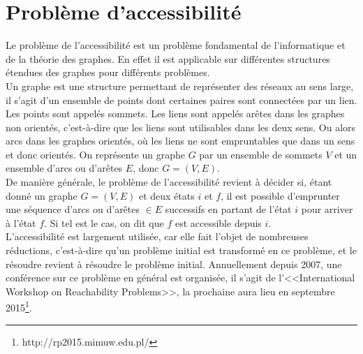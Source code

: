 \documentclass[11pt,a4paper,oneside]{book}
\theoremstyle{break}
\theoremstyle{breakplain}
\begin{document}
\section{Problème d'accessibilité}
Le problème de l'accessibilité est un problème fondamental de l'informatique et de la théorie des graphes. En effet il est applicable sur différentes structures étendues des graphes pour différents problèmes.\\
Un graphe est une structure permettant de représenter des réseaux au sens large, il s'agit d'un ensemble de points dont certaines paires sont connectées  par un lien. Les points sont appelés sommets. Les liens sont appelés arêtes dans les graphes non orientés, c'est-à-dire que les liens sont utilisables dans les deux sens. Ou alors arcs dans les graphes orientés, où les liens ne sont empruntables que dans un sens et donc orientés. On représente un graphe $G$ par un ensemble de sommets $V$ et un ensemble d'arcs ou d'arêtes $E$, donc $G = (V, E)$.\\
De manière générale, le problème de l'accessibilité revient à décider si, étant donné un graphe $G = (V, E)$ et deux états $i$ et $f$, il est possible d'emprunter une séquence d'arcs ou d'arêtes $\in E$ successifs en partant de l'état $i$ pour arriver à l'état $f$. Si tel est le cas, on dit que $f$ est accessible depuis $i$.\\

L'accessibilité est largement utilisée, car elle fait l'objet de nombreuses réductions, c'est-à-dire qu'un problème initial est transformé en ce problème, et le résoudre revient à résoudre le problème initial. Annuellement depuis 2007, une conférence sur ce problème en général est organisée, il s'agit de l'<<International Workshop on Reachability Problems>>, la prochaine aura lieu en septembre 2015\footnote{http://rp2015.mimuw.edu.pl/}.\\
\end{document}
